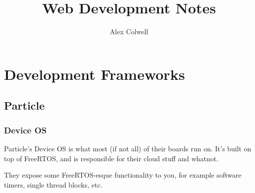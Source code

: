 \documentclass[a4paper,12pt,titlepage,oneside,final]{book}
\title{Web Development Notes}
\author{Alex Colwell}
\begin{document}
\maketitle
\tableofcontents
\chapter{Development Frameworks}
\section{Particle}
\subsection{Device OS}
Particle's Device OS is what most (if not all) of their boards run on. It's built on top of FreeRTOS, and is responsible for their cloud stuff and whatnot. 

They expose some FreeRTOS-esque functionality to you, for example software timers, single thread blocks, etc. 
\end{document}
